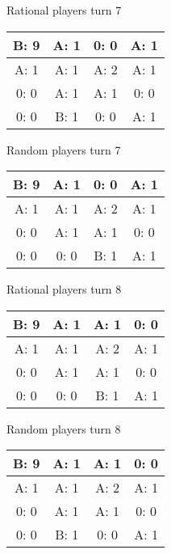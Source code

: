 \documentclass[12pt]{article}
\begin{document}
Rational players turn 7
\begin{center}
\begin{tabular}{|c|c|c|c|}
\hline
B: 9  & A: 1  & 0: 0  & A: 1  \\ \hline
A: 1  & A: 1  & A: 2  & A: 1  \\ \hline
0: 0  & A: 1  & A: 1  & 0: 0  \\ \hline
0: 0  & B: 1  & 0: 0  & A: 1  \\ \hline
\end{tabular}
\end{center}
Random players turn 7
\begin{center}
\begin{tabular}{|c|c|c|c|}
\hline
B: 9  & A: 1  & 0: 0  & A: 1  \\ \hline
A: 1  & A: 1  & A: 2  & A: 1  \\ \hline
0: 0  & A: 1  & A: 1  & 0: 0  \\ \hline
0: 0  & 0: 0  & B: 1  & A: 1  \\ \hline
\end{tabular}
\end{center}

Rational players turn 8
\begin{center}
\begin{tabular}{|c|c|c|c|}
\hline
B: 9  & A: 1  & A: 1  & 0: 0  \\ \hline
A: 1  & A: 1  & A: 2  & A: 1  \\ \hline
0: 0  & A: 1  & A: 1  & 0: 0  \\ \hline
0: 0  & 0: 0  & B: 1  & A: 1  \\ \hline
\end{tabular}
\end{center}
Random players turn 8
\begin{center}
\begin{tabular}{|c|c|c|c|}
\hline
B: 9  & A: 1  & A: 1  & 0: 0  \\ \hline
A: 1  & A: 1  & A: 2  & A: 1  \\ \hline
0: 0  & A: 1  & A: 1  & 0: 0  \\ \hline
0: 0  & B: 1  & 0: 0  & A: 1  \\ \hline
\end{tabular}
\end{center}
\end{document}
